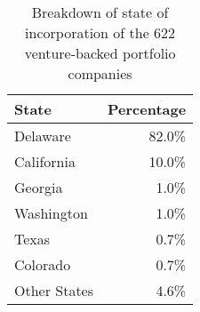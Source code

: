 
\begin{table}
    \centering

\caption{\label{tab:pcritable2} Breakdown of state of incorporation of the 622 venture-backed portfolio companies}
\begin{tabular}[t]{lr}
\toprule
State & Percentage\\
\midrule
Delaware & 82.0\% \\ 
California & 10.0\% \\ 
Georgia & 1.0\% \\ 
Washington & 1.0\% \\
Texas & 0.7\% \\ 
Colorado & 0.7\% \\ 
Other States & 4.6\% \\ 
\bottomrule
\end{tabular}
\end{table}

